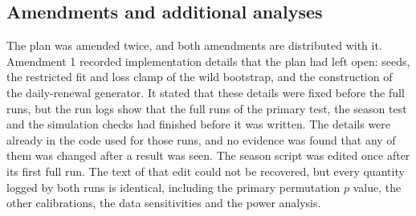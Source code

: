 \subsection{Amendments and additional analyses}
\label{sec:diag-amend2}

The plan was amended twice, and both amendments are distributed with it. Amendment 1 recorded implementation details that the plan had left open: seeds, the restricted fit and loss clamp of the wild bootstrap, and the construction of the daily-renewal generator. It stated that these details were fixed before the full runs, but the run logs show that the full runs of the primary test, the season test and the simulation checks had finished before it was written. The details were already in the code used for those runs, and no evidence was found that any of them was changed after a result was seen. The season script was edited once after its first full run. The text of that edit could not be recovered, but every quantity logged by both runs is identical, including the primary permutation $p$ value, the other calibrations, the data sensitivities and the power analysis.

